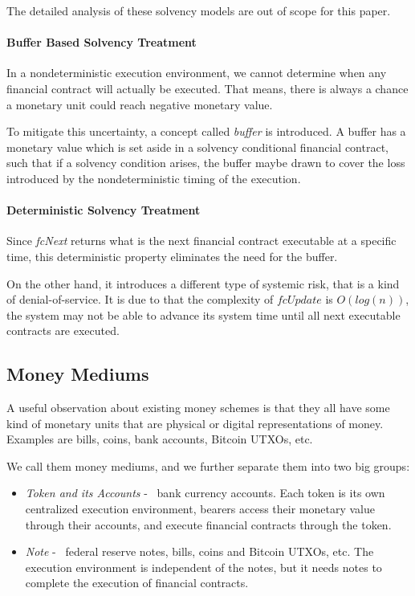 The detailed analysis of these solvency models are out of scope for this paper.

\paragraph{Buffer Based Solvency Treatment}

In a nondeterministic execution environment, we cannot determine when any financial contract will
actually be executed. That means, there is always a chance a monetary unit could reach negative
monetary value.

To mitigate this uncertainty, a concept called \textit{buffer} is introduced. A buffer has a
monetary value which is set aside in a solvency conditional financial contract, such that if a
solvency condition arises, the buffer maybe drawn to cover the loss introduced by the
nondeterministic timing of the execution.

\paragraph{Deterministic Solvency Treatment}

Since \textit{fcNext} returns what is the next financial contract executable at a specific time,
this deterministic property eliminates the need for the buffer.

On the other hand, it introduces a different type of systemic risk, that is a kind of
denial-of-service. It is due to that the complexity of $fcUpdate$ is $O(log(n))$, the system may not
be able to advance its system time until all next executable contracts are executed.

\subsection{Money Mediums}

\begin{displayquote}
A useful observation about existing money schemes is that they all have some kind of monetary units
that are physical or digital representations of money. Examples are bills, coins, bank accounts,
Bitcoin UTXOs, etc. 
\end{displayquote}

We call them money mediums, and we further separate them into two big groups:

\begin{itemize}
    \item \textit{Token and its Accounts} - \eg\ bank currency accounts. Each token is its own
centralized execution environment, bearers access their monetary value through their accounts, and
execute financial contracts through the token.

    \item \textit{Note} - \eg\ federal reserve notes, bills, coins and Bitcoin UTXOs, etc. The
execution environment is independent of the notes, but it needs notes to complete the execution of
financial contracts.
\end{itemize}

